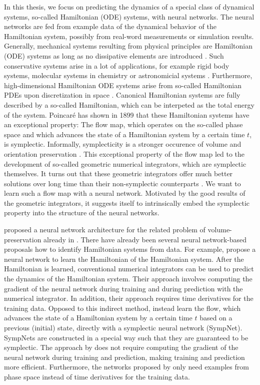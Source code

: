 \documentclass[twoside,a4paper]{article}
\begin{document}
In this thesis, we focus on predicting the dynamics of a special class of dynamical
systems, so-called Hamiltonian (ODE) systems, with neural networks. The neural networks
are fed from example data of the dynamical behavior of the Hamiltonian system,
possibly from real-word measurements or simulation results.
Generally, mechanical systems resulting from physical principles are
Hamiltonian (ODE) systems as long as no dissipative elements are introduced 
\cite{leimkuhler_reich_2005}. Such conservative systems arise in a lot
of applications, for example rigid body systems, molecular systems in chemistry or
astronomicial systems \cite{leimkuhler_reich_2005}. Furthermore, high-dimensional
Hamiltonian ODE systems arise from so-called Hamiltonian PDEs upon discretization
in space \cite{leimkuhler_reich_2005}. Canonical Hamiltonian systems are fully described
by a so-called Hamiltonian, which can be interpeted as the total energy of the system.
Poincaré has shown in 1899 that these Hamiltonian
systems have an exceptional property: The flow map, which operates on the so-called phase space 
and which advances the state of a Hamiltonian system by a certain time $t$, is symplectic. 
Informally, symplecticity is a stronger occurence of volume and orientation preservation
\cite{leimkuhler_reich_2005}. This exceptional property of the flow map led to the development of 
so-called geometric numerical integrators, which are symplectic themselves. It turns out 
that these geometric integrators offer much better solutions over long time than their
non-symplectic counterparts \cite{hairer2006}. We want to learn such a flow map with 
a neural network. Motivated by the good results of the geometric integrators,
it suggests itself to intrinsically embed the symplectic property into the structure
of the neural networks.

\citet{Deco1995} proposed a neural network architecture for the related
problem of volume-preservation already in \citeyear{Deco1995}. 
There have already been several neural network-based proposals how to identify 
Hamiltonian systems from data.
For example, \citet{Greydanus2019} propose a neural network to learn the Hamiltonian
of the Hamiltonian system. After the Hamiltonian is learned, conventional numerical
integrators can be used to predict the dynamics of the Hamiltonian system.
Their approach involves computing the gradient of the neural network during training
and during prediction with the numerical integrator. In addition, their approach 
requires time derivatives for the training data.
Opposed to this indirect method, \citet{Jin2020} instead learn the flow, 
which advances the state of a Hamiltonian system by a certain time $t$ based on a
previous (initial) state, directly with a symplectic neural network (SympNet). 
SympNets are constructed in a special way such that they are guaranteed to be symplectic.
The approach by \citeauthor{Jin2020} does not require computing the gradient of the neural
network during training and prediction, making training and 
prediction more efficient. Furthermore, the networks proposed by \citeauthor{Jin2020}
only need examples from phase space instead of time derivatives for the training data.
\end{document}
